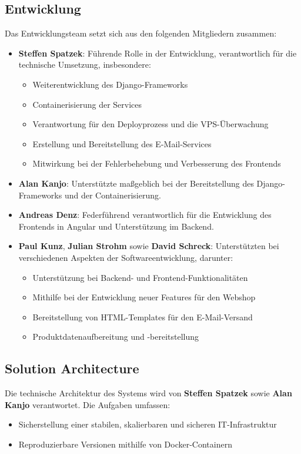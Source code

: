 \documentclass[%
	12pt,
	a4paper,
	oneside,
	parskip=full
]{scrbook}
\begin{document}
\subsection{Entwicklung}
Das Entwicklungsteam setzt sich aus den folgenden Mitgliedern zusammen:
\begin{itemize}
	\item \textbf{Steffen Spatzek}: Führende Rolle in der Entwicklung, verantwortlich für die technische Umsetzung, insbesondere:
	\begin{itemize}
		\item Weiterentwicklung des Django-Frameworks
		\item Containerisierung der Services
		\item Verantwortung für den Deployprozess und die VPS-Überwachung
		\item Erstellung und Bereitstellung des E-Mail-Services
		\item Mitwirkung bei der Fehlerbehebung und Verbesserung des Frontends 
	\end{itemize}
	\item \textbf{Alan Kanjo}: Unterstützte maßgeblich bei der Bereitstellung des Django-Frameworks und der Containerisierung.
	\item \textbf{Andreas Denz}: Federführend verantwortlich für die Entwicklung des Frontends in Angular und Unterstützung im Backend.
	\item \textbf{Paul Kunz}, \textbf{Julian Strohm} sowie \textbf{David Schreck}: Unterstützten bei verschiedenen Aspekten der Softwareentwicklung, darunter:
	\begin{itemize}
		\item Unterstützung bei Backend- und Frontend-Funktionalitäten
		\item Mithilfe bei der Entwicklung neuer Features für den Webshop
		\item Bereitstellung von HTML-Templates für den E-Mail-Versand
		\item Produktdatenaufbereitung und -bereitstellung
	\end{itemize}
\end{itemize}

\subsection{Solution Architecture}
Die technische Architektur des Systems wird von \textbf{Steffen Spatzek} sowie \textbf{Alan Kanjo} verantwortet. Die Aufgaben umfassen:
\begin{itemize}
	\item Sicherstellung einer stabilen, skalierbaren und sicheren IT-Infrastruktur
	\item Reproduzierbare Versionen mithilfe von Docker-Containern
\end{itemize}
\end{document}
